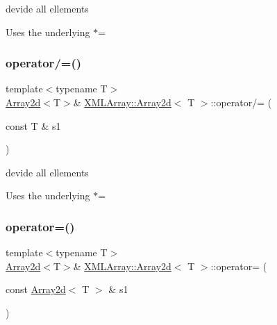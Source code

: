 devide all ellements 

Uses the underlying $\ast$= \mbox{\label{classXMLArray_1_1Array2d_aa699e2de82efb77e8e5e875a63eb7d8b}} 
\subsubsection{\texorpdfstring{operator/=()}{operator/=()}\hspace{0.1cm}{\footnotesize\ttfamily [6/6]}}
{\footnotesize\ttfamily template$<$typename T$>$ \\
\mbox{\hyperlink{classXMLArray_1_1Array2d}{Array2d}}$<$T$>$\& \mbox{\hyperlink{classXMLArray_1_1Array2d}{X\+M\+L\+Array\+::\+Array2d}}$<$ T $>$\+::operator/= (\begin{DoxyParamCaption}\item[{const T \&}]{s1 }\end{DoxyParamCaption})\hspace{0.3cm}{\ttfamily [inline]}}



devide all ellements 

Uses the underlying $\ast$= \mbox{\label{classXMLArray_1_1Array2d_a9fafd7ae228834d56b08fb5b1485eba4}} 
\subsubsection{\texorpdfstring{operator=()}{operator=()}\hspace{0.1cm}{\footnotesize\ttfamily [1/6]}}
{\footnotesize\ttfamily template$<$typename T$>$ \\
\mbox{\hyperlink{classXMLArray_1_1Array2d}{Array2d}}$<$T$>$\& \mbox{\hyperlink{classXMLArray_1_1Array2d}{X\+M\+L\+Array\+::\+Array2d}}$<$ T $>$\+::operator= (\begin{DoxyParamCaption}\item[{const \mbox{\hyperlink{classXMLArray_1_1Array2d}{Array2d}}$<$ T $>$ \&}]{s1 }\end{DoxyParamCaption})\hspace{0.3cm}{\ttfamily [inline]}}



